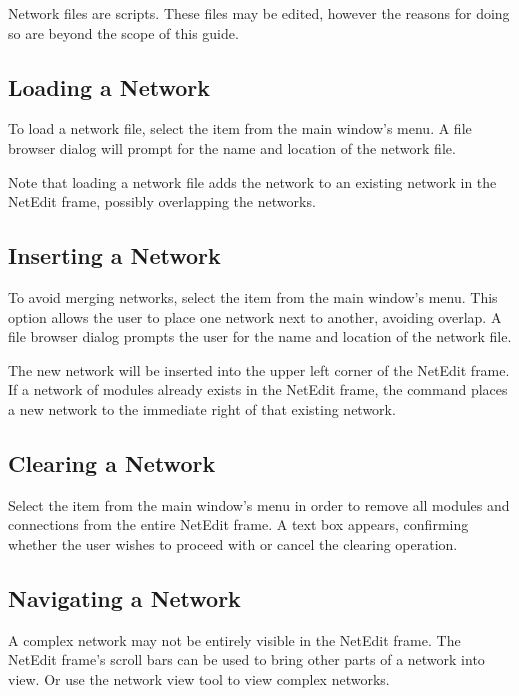 Network files are   scripts.
These files may be edited, however the reasons for doing so are beyond
the scope of this guide.

\subsection{Loading a Network}
\label{sec:opennet}

To load a network file, select the  item from the main
window's  menu.   A file browser dialog will prompt for the
name and location of the network file.

Note that loading a network file adds the network to an existing network in
the NetEdit frame, possibly overlapping the networks.

\subsection{Inserting a Network}
\label{sec:insertnetwork}

To avoid merging networks, select the
 item from the main window's  menu. This
option allows the user to place one \sr{} network next to another,
avoiding overlap.  A file browser dialog prompts the user for the name and
location of the network file.

The new network will be inserted into the upper left corner of the
NetEdit frame.  If a network of modules already exists in the NetEdit
frame, the  command places a new network to the
immediate right of that existing network.

\subsection{Clearing a Network}
\label{sec:clearnetwork}

Select the  item from the main window's 
menu in order to remove all modules and connections from the entire
NetEdit frame.  A text box appears, confirming whether the user wishes
to proceed with or cancel the clearing operation.

\subsection{Navigating a Network}
\label{sec:navnetwork}

A complex network may not be entirely visible in the NetEdit frame.
The NetEdit frame's scroll bars can be used to bring other parts of a network into
view.  Or use the network view tool to view complex networks.

